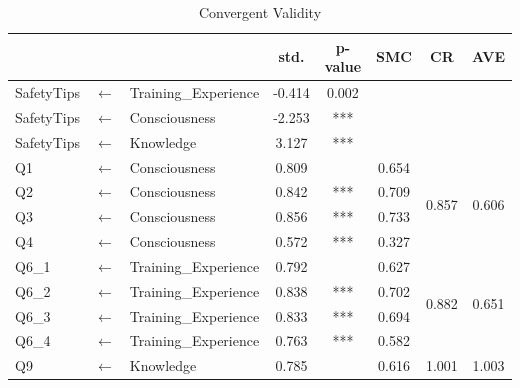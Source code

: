 \begin{table}[h]
  \caption{Convergent Validity}
  \label{table35}
  \centering
  \begin{tabular}{lcl|cc|ccc}
  \hline
   & & & std.   & p-value           & SMC                  & CR                     & AVE                    \\
\hline
SafetyTips           & $\longleftarrow$       & Training\_Experience & -0.414 & 0.002                & \multicolumn{3}{l}{}    \\
SafetyTips           & $\longleftarrow$       & Consciousness        & -2.253 & ***                  & \multicolumn{3}{l}{} \\
SafetyTips           & $\longleftarrow$       & Knowledge            & 3.127  & ***                  & \multicolumn{3}{l}{}   \\
\hline
Q1                   & $\longleftarrow$       & Consciousness        & 0.809  &  & 0.654                & \multirow{4}{*}{0.857} & \multirow{4}{*}{0.606} \\
Q2                   & $\longleftarrow$       & Consciousness        & 0.842  & ***                  & 0.709                &                        &                        \\
Q3                   & $\longleftarrow$       & Consciousness        & 0.856  & ***                  & 0.733                &                        &                        \\
Q4                   & $\longleftarrow$       & Consciousness        & 0.572  & ***                  & 0.327                &                        &                        \\
\hline
Q6\_1                & $\longleftarrow$       & Training\_Experience & 0.792  &  & 0.627                & \multirow{4}{*}{0.882} & \multirow{4}{*}{0.651} \\
Q6\_2                & $\longleftarrow$       & Training\_Experience & 0.838  & ***                  & 0.702                &                        &                        \\
Q6\_3                & $\longleftarrow$       & Training\_Experience & 0.833  & ***                  & 0.694                &                        &                        \\
Q6\_4                & $\longleftarrow$       & Training\_Experience & 0.763  & ***                  & 0.582                &                        &                        \\
\hline
Q9                   & $\longleftarrow$       & Knowledge            & 0.785  &  & 0.616                & \multirow{2}{*}{1.001} & \multirow{2}{*}{1.003} \\

\end{tabular}
\end{table}
